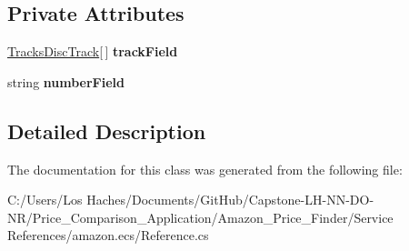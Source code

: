 \subsection*{Private Attributes}
\begin{DoxyCompactItemize}
\item 
\hypertarget{class_price___comparison_1_1amazon_1_1ecs_1_1_tracks_disc_a71daa6e6f6829f5c4eac748f3d9fed58}{\hyperlink{class_price___comparison_1_1amazon_1_1ecs_1_1_tracks_disc_track}{Tracks\-Disc\-Track}\mbox{[}$\,$\mbox{]} {\bfseries track\-Field}}\label{class_price___comparison_1_1amazon_1_1ecs_1_1_tracks_disc_a71daa6e6f6829f5c4eac748f3d9fed58}

\item 
\hypertarget{class_price___comparison_1_1amazon_1_1ecs_1_1_tracks_disc_a8b277ea76f92311afd8f8748ed5d7085}{string {\bfseries number\-Field}}\label{class_price___comparison_1_1amazon_1_1ecs_1_1_tracks_disc_a8b277ea76f92311afd8f8748ed5d7085}

\end{DoxyCompactItemize}


\subsection{Detailed Description}


The documentation for this class was generated from the following file\-:\begin{DoxyCompactItemize}
\item 
C\-:/\-Users/\-Los Haches/\-Documents/\-Git\-Hub/\-Capstone-\/\-L\-H-\/\-N\-N-\/\-D\-O-\/\-N\-R/\-Price\-\_\-\-Comparison\-\_\-\-Application/\-Amazon\-\_\-\-Price\-\_\-\-Finder/\-Service References/amazon.\-ecs/Reference.\-cs\end{DoxyCompactItemize}
